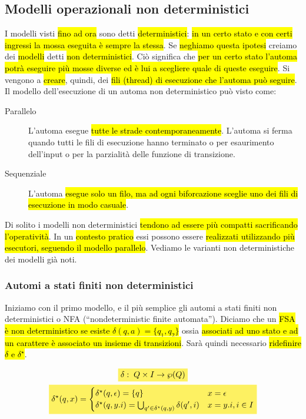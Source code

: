 \documentclass[a4paper,11pt,oneside]{article}
\theoremstyle{plain}
\theoremstyle{definition}
\theoremstyle{remark}
\newcommand{\mhl}[1]{\colorbox{hlcolor}{$\displaystyle #1$}}
\begin{document}
\subsection{Modelli operazionali non deterministici}\label{sec:modelli-non-det}

I modelli visti \hl{fino ad ora} sono detti \hl{deterministici}: \hl{in un certo
stato e con certi ingressi la mossa eseguita è sempre la stessa}. Se
\hl{neghiamo questa ipotesi} creiamo dei \hl{modelli} detti \hl{non
deterministici}. Ciò significa che \hl{per un certo stato l'automa potrà
eseguire più mosse diverse ed è lui a scegliere quale di queste eseguire}. Si
vengono a \hl{creare}, quindi, dei \hl{fili (thread) di esecuzione che l'automa
può seguire}. Il modello dell'esecuzione di un automa non deterministico può
visto come:

\begin{description}
  \item[Parallelo] L'automa esegue \hl{tutte le strade contemporaneamente}.
    L'automa si ferma quando tutti le fili di esecuzione hanno terminato o per
    esaurimento dell'input o per la parzialità delle funzione di transizione.
  \item[Sequenziale] L'automa \hl{esegue solo un filo, ma ad ogni biforcazione
    sceglie uno dei fili di esecuzione in modo casuale}.
\end{description}

Di solito i modelli non deterministici \hl{tendono ad essere più compatti
sacrificando l'operatività}. In un \hl{contesto pratico} essi possono essere
\hl{realizzati utilizzando più esecutori, seguendo il modello parallelo}.
Vediamo le varianti non deterministiche dei modelli già noti.

\subsubsection{Automi a stati finiti non deterministici}\label{sec:nfa}

Iniziamo con il primo modello, e il più semplice gli automi a stati finiti non
deterministici o NFA (``nondeterministic finite automata''). Diciamo che un
\hl{FSA è non deterministico se esiste $\delta(q, a) = \{q_1, q_2\}$} ossia
\hl{associati ad uno stato e ad un carattere è associato un insieme di
transizioni}. Sarà quindi necessario \hl{ridefinire $\delta$ e $\delta^\star$}.

\begin{gather}
  \mhl{ \delta: \; Q \times I \to \wp(Q) } \\
  \mhl{
    \delta^\star(q,x) =
    \begin{cases}
      \delta^\star(q, \epsilon) = \{q\} & x = \epsilon \\
      \delta^\star(q, y.i) = \bigcup_{q' \in \delta^\star(q, y)} \delta(q', i) &
        x=y.i, i \in I
    \end{cases}
  }
\end{gather}
\end{document}
